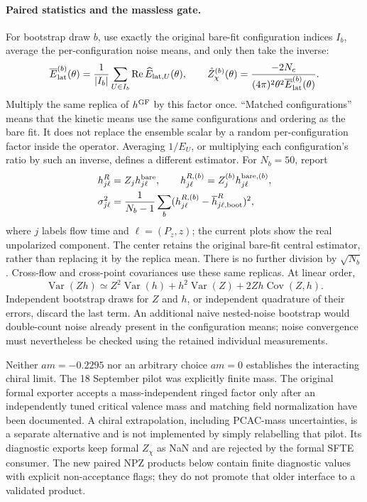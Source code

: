 \documentclass[11pt]{article}
\numberwithin{equation}{section}
\begin{document}
\paragraph{Paired statistics and the massless gate.}
For bootstrap draw \(b\), use exactly the original bare-fit configuration
indices \(I_b\), average the per-configuration noise means, and only then
take the inverse:
\begin{equation}
 \overline E^{(b)}_{\rm lat}(\theta)
 =\frac{1}{|I_b|}\sum_{U\in I_b}\operatorname{Re}
                  \widehat E_{{\rm lat},U}(\theta),\qquad
 \mathring Z_\chi^{(b)}(\theta)
 =\frac{-2N_c}{(4\pi)^2\theta^2\overline E^{(b)}_{\rm lat}(\theta)}.
 \label{eq:ringed-paired-bootstrap}
\end{equation}
Multiply the same replica of \(h^{\rm GF}\) by this factor once.
``Matched configurations'' means that the kinetic means use the same
configurations and ordering as the bare fit. It does not replace the
ensemble scalar by a random per-configuration factor inside the operator.
Averaging \(1/E_U\), or multiplying each configuration's ratio by such an
inverse, defines a different estimator. For \(N_b=50\), report
\begin{align}
 h^R_{j\ell}&=Z_j h^{\rm bare}_{j\ell},\qquad
 h^{R,(b)}_{j\ell}=Z_j^{(b)}h^{{\rm bare},(b)}_{j\ell},\\
 \sigma^2_{j\ell}&=\frac1{N_b-1}\sum_b
 (h^{R,(b)}_{j\ell}-\overline h^R_{j\ell,\rm boot})^2,
 \label{eq:ringed-product-error}
\end{align}
where \(j\) labels flow time and \(\ell=(P_z,z)\); the current plots show
the real unpolarized component. The center retains the original bare-fit
central estimator, rather than replacing it by the replica mean.
There is no further division by \(\sqrt{N_b}\). Cross-flow and cross-point
covariances use these same replicas. At linear order,
\begin{equation}
 \operatorname{Var}(Zh)\simeq Z^2\operatorname{Var}(h)
 +h^2\operatorname{Var}(Z)+2Zh\operatorname{Cov}(Z,h).
\end{equation}
Independent bootstrap draws for \(Z\) and \(h\), or independent quadrature
of their errors, discard the last term. An additional naive
nested-noise bootstrap would double-count noise already present in the
configuration means; noise convergence must nevertheless be checked using
the retained individual measurements.

Neither \(am=-0.2295\) nor an arbitrary choice \(am=0\) establishes the
interacting chiral limit. The 18 September pilot was explicitly finite mass.
The original formal exporter accepts a mass-independent ringed factor only after an
independently tuned critical valence mass and matching field normalization
have been documented.  A chiral extrapolation, including PCAC-mass
uncertainties, is a separate alternative and is not implemented by simply
relabelling that pilot. Its diagnostic exports keep formal \(Z_\chi\) as
NaN and are rejected by the formal SFTE consumer. The new paired NPZ products
below contain finite diagnostic values with explicit non-acceptance flags;
they do not promote that older interface to a validated product.
\end{document}
